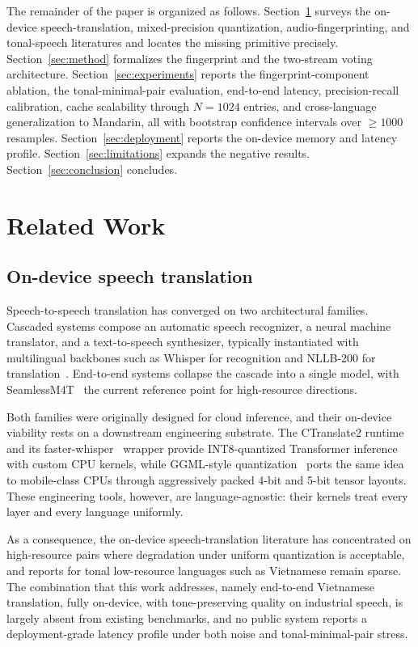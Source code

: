 \documentclass[a4paper,fleqn]{cas-dc}
\begin{document}
The remainder of the paper is organized as follows. Section~\ref{sec:related} surveys the on-device speech-translation, mixed-precision quantization, audio-fingerprinting, and tonal-speech literatures and locates the missing primitive precisely. Section~\ref{sec:method} formalizes the fingerprint and the two-stream voting architecture. Section~\ref{sec:experiments} reports the fingerprint-component ablation, the tonal-minimal-pair evaluation, end-to-end latency, precision-recall calibration, cache scalability through $N = 1024$ entries, and cross-language generalization to Mandarin, all with bootstrap confidence intervals over $\geq 1000$ resamples. Section~\ref{sec:deployment} reports the on-device memory and latency profile. Section~\ref{sec:limitations} expands the negative results. Section~\ref{sec:conclusion} concludes.

\section{Related Work}\label{sec:related}

\subsection{On-device speech translation}\label{sec:related:s2st}

Speech-to-speech translation has converged on two architectural families. Cascaded systems compose an automatic speech recognizer, a neural machine translator, and a text-to-speech synthesizer, typically instantiated with multilingual backbones such as Whisper for recognition and NLLB-200 for translation~\citep{nllb2022}. End-to-end systems collapse the cascade into a single model, with SeamlessM4T~\citep{seamlessm4t2023} the current reference point for high-resource directions.

Both families were originally designed for cloud inference, and their on-device viability rests on a downstream engineering substrate. The CTranslate2 runtime~\citep{ctranslate2} and its faster-whisper~\citep{fasterwhisper} wrapper provide INT8-quantized Transformer inference with custom CPU kernels, while GGML-style quantization~\citep{ggml2023} ports the same idea to mobile-class CPUs through aggressively packed 4-bit and 5-bit tensor layouts. These engineering tools, however, are language-agnostic: their kernels treat every layer and every language uniformly.

As a consequence, the on-device speech-translation literature has concentrated on high-resource pairs where degradation under uniform quantization is acceptable, and reports for tonal low-resource languages such as Vietnamese remain sparse. The combination that this work addresses, namely end-to-end Vietnamese translation, fully on-device, with tone-preserving quality on industrial speech, is largely absent from existing benchmarks, and no public system reports a deployment-grade latency profile under both noise and tonal-minimal-pair stress.
\end{document}
